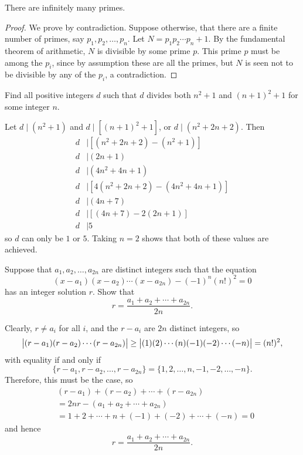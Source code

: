 \begin{theorem}[Euclid]
There are infinitely many primes.
\end{theorem}

\begin{proof}
We prove by contradiction. Suppose otherwise, that there are a finite number of primes, say $p_1,p_2,\dots,p_n$. Let $N=p_1p_2\cdots p_n+1$. By the fundamental theorem of arithmetic, $N$ is divisible by some prime $p$. This prime $p$ must be among the $p_i$, since by assumption these are all the primes, but $N$ is seen not to be divisible by any of the $p_i$, a contradiction.
\end{proof}

\begin{exercise}
Find all positive integers $d$ such that $d$ divides both $n^2+1$ and $(n+1)^2+1$ for some integer $n$.
\end{exercise}

\begin{solution}
Let $d\mid(n^2+1)$ and $d\mid[(n+1)^2+1]$, or $d\mid(n^2+2n+2)$. Then
\begin{align*}
d&\mid[(n^2+2n+2)-(n^2+1)]\\
d&\mid(2n+1)\\
d&\mid(4n^2+4n+1)\\
d&\mid[4(n^2+2n+2)-(4n^2+4n+1)]\\
d&\mid(4n+7)\\
d&\mid[(4n+7)-2(2n+1)]\\
d&\mid5 
\end{align*}
so $d$ can only be $1$ or $5$. Taking $n=2$ shows that both of these values are achieved.
\end{solution}

\begin{exercise}
Suppose that $a_1,a_2,\dots,a_{2n}$ are distinct integers such that the equation
\[(x-a_1)(x-a_2)\cdots(x-a_{2n})-(-1)^n(n!)^2=0\]
has an integer solution $r$. Show that
\[r=\frac{a_1+a_2+\cdots+a_{2n}}{2n}.\]
\end{exercise}

\begin{solution}
Clearly, $r\neq a_i$ for all $i$, and the $r-a_i$ are $2n$ distinct integers, so
\[\left|(r-a_1)(r-a_2)\cdots(r-a_{2n})\right|\ge\left|(1)(2)\cdots(n)(-1)(-2)\cdots(-n)\right|=(n!)^2,\]
with equality if and only if
\[\{r-a_1,r-a_2,\dots,r-a_{2n}\}=\{1,2,\dots,n,-1,-2,\dots,-n\}.\]
Therefore, this must be the case, so
\begin{align*}
&(r-a_1)+(r-a_2)+\cdots+(r-a_{2n})\\
&=2nr-(a_1+a_2+\cdots+a_{2n})\\
&=1+2+\cdots+n+(-1)+(-2)+\cdots+(-n)=0
\end{align*}
and hence
\[r=\frac{a_1+a_2+\cdots+a_{2n}}{2n}.\]
\end{solution}

